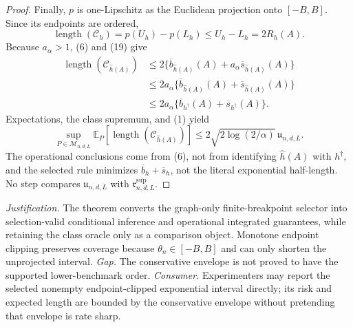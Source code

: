 \documentclass{article}
\begin{document}
\begin{proof}
Finally, \(p\) is one-Lipschitz as the Euclidean projection onto \([-B,B]\).  Since its endpoints are ordered,
\[
 \operatorname{length}(\mathcal C_h)
 =p(U_h)-p(L_h)\leq U_h-L_h=2R_h(A).
\tag{19}
\]
Because \(a_\alpha>1\), (6) and (19) give
\[
\begin{aligned}
 \operatorname{length}(\mathcal C_{\widehat h(A)})
 &\leq2\{\overline b_{\widehat h(A)}(A)+a_\alpha\overline s_{\widehat h(A)}(A)\}\\
 &\leq2a_\alpha\{\overline b_{\widehat h(A)}(A)+\overline s_{\widehat h(A)}(A)\}\\
 &\leq2a_\alpha\{\overline b_{h^\dagger}(A)+\overline s_{h^\dagger}(A)\}.
\end{aligned}
\tag{20}
\]
Expectations, the class supremum, and (1) yield
\[
 \sup_{P\in\mathcal M_{n,d,L}}
 \mathbb E_P[\operatorname{length}(\mathcal C_{\widehat h(A)})]
 \leq2\sqrt{2\log(2/\alpha)}\,\mathfrak u_{n,d,L}.
\tag{21}
\]
The operational conclusions come from (6), not from identifying \(\widehat h(A)\) with \(h^\dagger\), and the selected rule minimizes \(\overline b_h+\overline s_h\), not the literal exponential half-length.  No step compares \(\mathfrak u_{n,d,L}\) with \(\mathfrak r^{\mathrm{sup}}_{n,d,L}\).
\end{proof}
\par\smallskip\noindent \textit{Justification.} The theorem converts the graph-only finite-breakpoint selector into selection-valid conditional inference and operational integrated guarantees, while retaining the class oracle only as a comparison object. Monotone endpoint clipping preserves coverage because \(\theta_n\in[-B,B]\) and can only shorten the unprojected interval. \textit{Gap.} The conservative envelope is not proved to have the supported lower-benchmark order. \textit{Consumer.} Experimenters may report the selected nonempty endpoint-clipped exponential interval directly; its risk and expected length are bounded by the conservative envelope without pretending that envelope is rate sharp.
\end{document}
